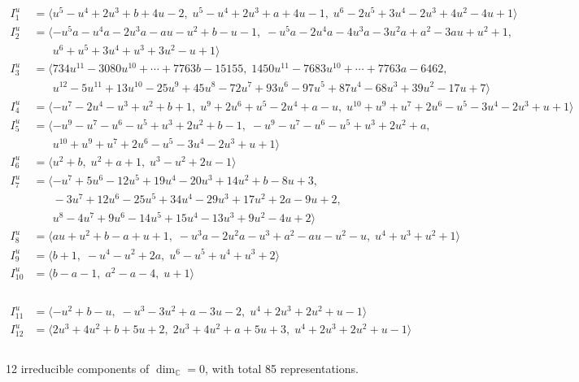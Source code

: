 \documentclass[1p]{elsarticle_modified}
\theoremstyle{definition}
\begin{document}
\begin{align*}
I^u_{1}&=\langle 
u^5- u^4+2 u^3+b+4 u-2,\;u^5- u^4+2 u^3+a+4 u-1,\;u^6-2 u^5+3 u^4-2 u^3+4 u^2-4 u+1\rangle \\
I^u_{2}&=\langle 
- u^5 a- u^4 a-2 u^3 a- a u- u^2+b- u-1,\;- u^5 a-2 u^4 a-4 u^3 a-3 u^2 a+a^2-3 a u+u^2+1,\\
\phantom{I^u_{2}}&\phantom{= \langle  }u^6+u^5+3 u^4+u^3+3 u^2- u+1\rangle \\
I^u_{3}&=\langle 
734 u^{11}-3080 u^{10}+\cdots+7763 b-15155,\;1450 u^{11}-7683 u^{10}+\cdots+7763 a-6462,\\
\phantom{I^u_{3}}&\phantom{= \langle  }u^{12}-5 u^{11}+13 u^{10}-25 u^9+45 u^8-72 u^7+93 u^6-97 u^5+87 u^4-68 u^3+39 u^2-17 u+7\rangle \\
I^u_{4}&=\langle 
- u^7-2 u^4- u^3+u^2+b+1,\;u^9+2 u^6+u^5-2 u^4+a- u,\;u^{10}+u^9+u^7+2 u^6- u^5-3 u^4-2 u^3+u+1\rangle \\
I^u_{5}&=\langle 
- u^9- u^7- u^6- u^5+u^3+2 u^2+b-1,\;- u^9- u^7- u^6- u^5+u^3+2 u^2+a,\\
\phantom{I^u_{5}}&\phantom{= \langle  }u^{10}+u^9+u^7+2 u^6- u^5-3 u^4-2 u^3+u+1\rangle \\
I^u_{6}&=\langle 
u^2+b,\;u^2+a+1,\;u^3- u^2+2 u-1\rangle \\
I^u_{7}&=\langle 
- u^7+5 u^6-12 u^5+19 u^4-20 u^3+14 u^2+b-8 u+3,\\
\phantom{I^u_{7}}&\phantom{= \langle  }-3 u^7+12 u^6-25 u^5+34 u^4-29 u^3+17 u^2+2 a-9 u+2,\\
\phantom{I^u_{7}}&\phantom{= \langle  }u^8-4 u^7+9 u^6-14 u^5+15 u^4-13 u^3+9 u^2-4 u+2\rangle \\
I^u_{8}&=\langle 
a u+u^2+b- a+u+1,\;- u^3 a-2 u^2 a- u^3+a^2- a u- u^2- u,\;u^4+u^3+u^2+1\rangle \\
I^u_{9}&=\langle 
b+1,\;- u^4- u^2+2 a,\;u^6- u^5+u^4+u^3+2\rangle \\
I^u_{10}&=\langle 
b- a-1,\;a^2- a-4,\;u+1\rangle \\
\end{align*}\\
\begin{align*}
I^u_{11}&=\langle 
- u^2+b- u,\;- u^3-3 u^2+a-3 u-2,\;u^4+2 u^3+2 u^2+u-1\rangle \\
I^u_{12}&=\langle 
2 u^3+4 u^2+b+5 u+2,\;2 u^3+4 u^2+a+5 u+3,\;u^4+2 u^3+2 u^2+u-1\rangle \\
\\
\end{align*}
\raggedright * 12 irreducible components of $\dim_{\mathbb{C}}=0$, with total 85 representations.\\
\end{document}
